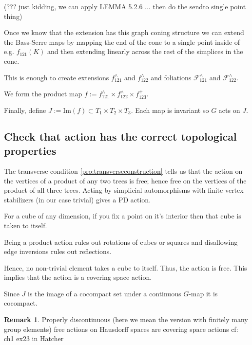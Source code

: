 \documentclass[12pt,parskip=full]{report}
\theoremstyle{plain}
\theoremstyle{definition}
\newtheorem{rmk}[thm]{Remark}
\begin{document}
        (??? just kidding, we can apply LEMMA 5.2.6 ... then do the sendto single point thing)
        
        Once we know that the extension has this graph coning structure we can extend the Bass-Serre maps by mapping the end of the cone to a single point inside of e.g. \(f_{121}(K)\) and then extending linearly across the rest of the simplices in the cone.
        
        This is enough to create extensions \(f_{121}^{\wedge}\) and \(f_{122}^{\wedge}\) and foliations \(\mathscr{F}^{\wedge}_{121}\) and \(\mathscr{F}^{\wedge}_{122}\). 
        
         We form the product map \(f:= f_{121}^{\wedge} \times f_{122}^{\wedge} \times f_{123}^{+}\). 
        
        Finally, define \(J := \text{Im}(f) \subset T_1\times T_2\times T_3\). Each map is invariant so \(G\) acts on \(J\).
        
    \subsection{Check that action has the correct topological properties}
    
    
        The transverse condition \ref{pro:transverseconstruction} tells us that the action on the vertices of a product of any two trees is free; hence free on the vertices of the product of all three trees. Acting by simplicial automorphisms with finite vertex stabilizers (in our case trivial) gives a PD action. 
        
        For a cube of any dimension, if you fix a point on it's interior then that cube is taken to itself.
        
        Being a product action rules out rotations of cubes or squares and disallowing edge inversions rules out reflections.
        
        Hence, no non-trivial element takes a cube to itself. Thus, the action is free. This implies that the action is a covering space action.
        
        Since \(J\) is the image of a cocompact set under a continuous \(G\)-map it is cocompact.
        
        \begin{rmk}
            Properly discontinuous (here we mean the version with finitely many group elements) free actions on Hausdorff spaces are covering space actions cf: ch1 ex23 in Hatcher
        \end{rmk}
        
\end{document}
